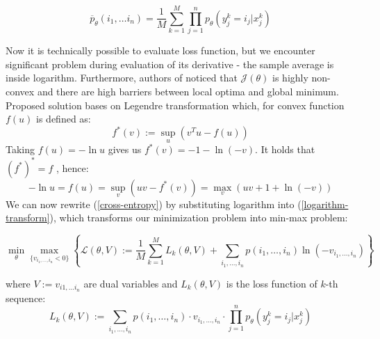 \documentclass[shortabstract,lic,english]{iithesis}
\begin{document}
\begin{equation} \label{expected-probability}
    \overline{p}_\theta(i_1, \dots i_n) = \frac{1}{M}\sum_{k=1}^{M}\prod_{j=1}^{n}p_\theta(y_j^k = i_j | x_j^k)
\end{equation}

Now it is technically possible to evaluate loss function, but we encounter significant problem during evaluation
of its derivative - the sample average is inside logarithm. Furthermore, authors of \citep{liu2017unsupervised} 
noticed that $\mathcal{J}(\theta)$ is highly non-convex and there are high barriers between local optima and
global minimum. Proposed solution bases on Legendre transformation 
\citep{nielsen2010legendre, boyd2004convex} which, for convex function $f(u)$ is defined as:
\begin{equation} \label{legendre-transformation}
    f^*(v) := \sup_{u}(v^Tu - f(u))
\end{equation}
Taking $f(u)=-\ln u$ gives us $f^*(v) = -1 - \ln(-v)$. It holds that $(f^*)^* = f$
\citep{boyd2004convex}, hence:
\begin{equation} \label{logarithm-transform}
    - \ln u = f(u) = \sup_v(uv - f^*(v)) = \max_v(uv + 1 + \ln(-v))
\end{equation}
We can now rewrite (\ref{cross-entropy}) by substituting logarithm into (\ref{logarithm-transform}),
which transforms our minimization problem into min-max problem:

\begin{equation} \label{min-max-definition}
    \min_\theta \max_{\lbrace v_{i_1, \dots , i_n} < 0 \rbrace} \left\lbrace 
    \mathcal{L}(\theta, V) := \frac{1}{M} \sum_{k=1}^M L_k(\theta, V) + \sum_{i_1, \dots, i_n} p(i_1, \dots, i_n) \ln(-v_{i_1, \dots, i_n})
    \right\rbrace 
\end{equation}

where $V := {v_{i1, \dots i_n}}$ are dual variables and $L_k(\theta, V)$ is the 
loss function of $k$-th sequence:
\begin{equation}
    L_k(\theta, V) := \sum_{i_1,\dots,i_n} p(i_1,\dots,i_n) \cdot v_{i_1,\dots,i_n} \cdot \prod_{j=1}^{n} p_\theta(y^k_j = i_j | x^k_j)
\end{equation}
\end{document}
